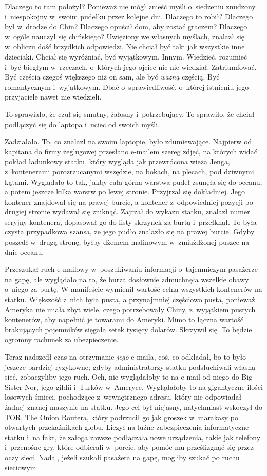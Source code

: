 \documentclass[oneside,polish,11pt,rmheadings]{mwbk}
\begin{document}
Dlaczego to tam położył? Ponieważ nie mógł znieść myśli o~siedzeniu znudzony i~niespokojny w~swoim pudełku przez kolejne dni. Dlaczego to robił? Dlaczego był w~drodze do Chin? Dlaczego opuścił dom, aby zostać graczem? Dlaczego w~ogóle nauczył się chińskiego? Uwięziony we własnych myślach, znalazł się w~obliczu dość brzydkich odpowiedzi. Nie chciał być taki jak wszystkie inne dzieciaki. Chciał się wyróżniać, być wyjątkowym. Innym. Wiedzieć, rozumieć i~być biegłym w~rzeczach, o~których jego ojciec nic nie wiedział. Zatriumfować. Być częścią czegoś większego niż on sam, ale być \textit{ważną }częścią. Być romantycznym i~wyjątkowym. Dbać o~sprawiedliwość, o~której istnieniu jego przyjaciele nawet nie wiedzieli.

To sprawiało, że czuł się smutny, żałosny i~potrzebujący. To sprawiło, że chciał podłączyć się do laptopa i~uciec od swoich myśli.

Zadziałało. To, co znalazł na swoim laptopie, było zdumiewające. Najpierw od kapitana do firmy żeglugowej przesłano e-mailem szereg zdjęć, na których widać pokład ładunkowy statku, który wygląda jak przewrócona wieża Jenga, z~kontenerami porozrzucanymi wszędzie, na bokach, na plecach, pod dziwnymi kątami. Wyglądało to tak, jakby cała górna warstwa pudeł zsunęła się do oceanu, a potem jeszcze kilka warstw po lewej stronie. Przyjrzał się dokładniej. Jego kontener znajdował się na prawej burcie, a kontener z~odpowiedniej pozycji po drugiej stronie wydawał się zniknąć. Zajrzał do wykazu statku, znalazł numer seryjny kontenera, dopasował go do listy skrzynek za burtą i~przełknął. To była czysta przypadkowa szansa, że jego pudło znalazło się na prawej burcie. Gdyby poszedł w~drugą stronę, byłby dżemem malinowym w~zmiażdżonej puszce na dnie oceanu.

Przeszukał ruch e-mailowy w~poszukiwaniu informacji o~tajemniczym pasażerze na gapę, ale wyglądało na to, że burza dosłownie zdmuchnęła wszelkie obawy o~niego za burtę. W manifeście wymienił wartość celną wszystkich kontenerów na statku. Większość z~nich była pusta, a przynajmniej częściowo pusta, ponieważ Ameryka nie miała zbyt wiele, czego potrzebowały Chiny, z~wyjątkiem pustych kontenerów, aby napełnić je towarami do Ameryki. Mimo to łączna wartość brakujących pojemników sięgała setek tysięcy dolarów. Skrzywił się. To będzie ogromny rachunek za ubezpieczenie.

Teraz nadszedł czas na otrzymanie \textit{jego }e-maila, coś, co odkładał, bo to było jeszcze bardziej ryzykowne; gdyby administratorzy statku podsłuchiwali własną sieć, zobaczyliby jego ruch. Och, nie wyglądałoby to na e-mail od niego do Big Sister Nor, jego gildii i~Turków w~Ameryce. Wyglądałoby to na gigantyczne ilości losowych śmieci, pochodzące z~wewnętrznego adresu, który nie odpowiadał żadnej znanej maszynie na statku. Jego cel był niejasny, natychmiast wskoczył do TOR, The Onion Routera, który podrzucił go jak groszek w~marakasy po otwartych przekaźnikach globu. Liczył na luźne zabezpieczenia informatyczne statku i~na fakt, że załoga zawsze podłączała nowe urządzenia, takie jak telefony i~przenośne gry, które odbierali w~porcie, aby pomóc mu prześlizgnąć się przez oczy sieci. Nadal, jeżeli szukali pasażera na gapę, mogliby szukać po ruchu sieciowym.
\end{document}
